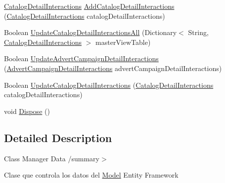 \begin{DoxyCompactItemize}
\item 
\hyperlink{class_microsoft_1_1_samples_1_1_kinect_1_1_basic_interactions_1_1_catalog_detail_interactions}{Catalog\-Detail\-Interactions} \hyperlink{class_microsoft_1_1_samples_1_1_kinect_1_1_basic_interactions_1_1_datos_ab72b202f4bad84c91734f57e2324a691}{Add\-Catalog\-Detail\-Interactions} (\hyperlink{class_microsoft_1_1_samples_1_1_kinect_1_1_basic_interactions_1_1_catalog_detail_interactions}{Catalog\-Detail\-Interactions} catalog\-Detail\-Interactions)
\item 
Boolean \hyperlink{class_microsoft_1_1_samples_1_1_kinect_1_1_basic_interactions_1_1_datos_a53833c541b79b28a7ec20174447bc970}{Update\-Catalog\-Detail\-Interactions\-All} (Dictionary$<$ String, \hyperlink{class_microsoft_1_1_samples_1_1_kinect_1_1_basic_interactions_1_1_catalog_detail_interactions}{Catalog\-Detail\-Interactions} $>$ master\-View\-Table)
\item 
Boolean \hyperlink{class_microsoft_1_1_samples_1_1_kinect_1_1_basic_interactions_1_1_datos_ae12741a432d54f495a75653583f79d7c}{Update\-Advert\-Campaign\-Detail\-Interactions} (\hyperlink{class_microsoft_1_1_samples_1_1_kinect_1_1_basic_interactions_1_1_advert_campaign_detail_interactions}{Advert\-Campaign\-Detail\-Interactions} advert\-Campaign\-Detail\-Interactions)
\item 
Boolean \hyperlink{class_microsoft_1_1_samples_1_1_kinect_1_1_basic_interactions_1_1_datos_a5284057fab60ffb7de4ddb97e9bbeb18}{Update\-Catalog\-Detail\-Interactions} (\hyperlink{class_microsoft_1_1_samples_1_1_kinect_1_1_basic_interactions_1_1_catalog_detail_interactions}{Catalog\-Detail\-Interactions} catalog\-Detail\-Interactions)
\item 
void \hyperlink{class_microsoft_1_1_samples_1_1_kinect_1_1_basic_interactions_1_1_datos_aac7ca32c71f5914cd485553df524bdff}{Dispose} ()
\end{DoxyCompactItemize}


\subsection{Detailed Description}
Class Manager Data /summary$>$ 

Clase que controla los datos del \hyperlink{class_microsoft_1_1_samples_1_1_kinect_1_1_basic_interactions_1_1_model}{Model} Entity Framework 

